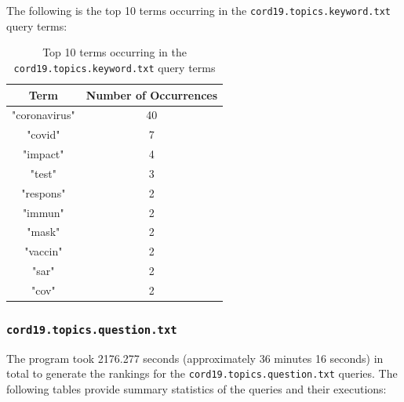 \documentclass[11pt]{article}
\begin{document}
The following is the top 10 terms occurring in the  \texttt{cord19.topics.keyword.txt} query terms:

\begin{table}[!ht]
    \caption{Top 10 terms occurring in the \texttt{cord19.topics.keyword.txt} query terms}
    \begin{center}

        \begin{tabular}{| c | c |}
        \hline
        \textbf{Term} & \textbf{Number of Occurrences}
        \\ \hline
        "coronavirus" & 40
        \\ \hline
        "covid" & 7
        \\ \hline
        "impact" & 4
        \\ \hline
        "test" & 3
        \\ \hline
        "respons" & 2
        \\ \hline
        "immun" & 2
        \\ \hline
        "mask" & 2
        \\ \hline
        "vaccin" & 2
        \\ \hline
        "sar" & 2
        \\ \hline
        "cov" & 2
        \\ \hline
        \end{tabular}

    \end{center}

\end{table}

\subsubsection{\texttt{cord19.topics.question.txt}}
The program took 2176.277 seconds (approximately 36 minutes 16 seconds) in total to generate the rankings for the \texttt{cord19.topics.question.txt} queries. The following tables provide summary statistics of the queries and their executions:

\end{document}
